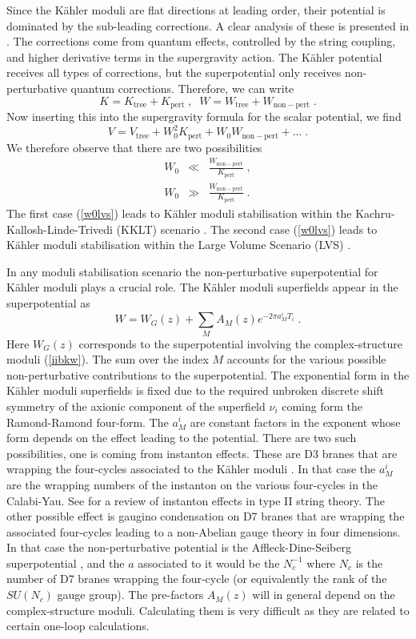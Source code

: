 \documentclass[11pt,a4paper]{article}
\numberwithin{equation}{section}
\numberwithin{table}{section}\setlength{\multlinegap}{25pt}
\newcommand{\bea}{\begin{eqnarray}}  \newcommand{\eea}{\end{eqnarray}}
\newcommand{\be}{\begin{equation}}
\newcommand{\ee}{\end{equation}}
\begin{document}
Since the K{\"a}hler moduli are flat directions at leading order, their potential is dominated by the sub-leading corrections. A clear analysis of these is presented in \cite{Conlon:2005ki}. The corrections come from quantum effects, controlled by the string coupling, and higher derivative terms in the supergravity action. The K{\"a}hler potential receives all types of corrections, but the superpotential only receives non-perturbative quantum corrections. Therefore, we can write 
\be
K = K_{\mathrm{tree}}  + K_{\mathrm{pert}} \;, \;\; W =  W_{\mathrm{tree}}  + W_{\mathrm{non-pert}} \;.
\ee
Now inserting this into the supergravity formula for the scalar potential, we find
\be
V = V_{\mathrm{tree}} + W_0^2 K_{\mathrm{pert}} + W_0 W_{\mathrm{non-pert}} + ... \;. 
\ee
We therefore observe that there are two possibilities 
\bea
\label{w0kklt}
W_0 &\ll& \frac{W_{\mathrm{non-pert}}}{K_{\mathrm{pert}}} \;, \\
W_0 &\gg& \frac{W_{\mathrm{non-pert}}}{K_{\mathrm{pert}}} \;.
\label{w0lvs}
\eea
The first case (\ref{w0lvs}) leads to K{\"a}hler moduli stabilisation within the Kachru-Kallosh-Linde-Trivedi (KKLT) scenario \cite{Kachru:2003aw}. The second case (\ref{w0lvs}) leads to K{\"a}hler moduli stabilisation within the Large Volume Scenario (LVS) \cite{Balasubramanian:2005zx}. 

In any moduli stabilisation scenario the non-perturbative superpotential for K{\"a}hler moduli plays a crucial role. The K{\"a}hler moduli superfields appear in the superpotential as
\be
W = W_G\left(z\right) + \sum_M A_M\left(z\right) e^{-2 \pi a^i_M T_i} \;.
\ee
Here $W_G\left(z\right)$ corresponds to the superpotential involving the complex-structure moduli (\ref{iibkw}). The sum over the index $M$ accounts for the various possible non-perturbative contributions to the superpotential. The exponential form in the K{\"a}hler moduli superfields is fixed due to the required unbroken discrete shift symmetry of the axionic component of the superfield $\nu_i$ coming form the Ramond-Ramond four-form. The $a^i_M$ are constant factors in the exponent whose form depends on the effect leading to the potential. There are two such possibilities, one is coming from instanton effects. These are D3 branes that are wrapping the four-cycles associated to the K{\"a}hler moduli \cite{Witten:1996bn}. In that case the $a^i_M$ are the wrapping numbers of the instanton on the various four-cycles in the Calabi-Yau. See \cite{Blumenhagen:2009qh} for a review of instanton effects in type II string theory. The other possible effect is gaugino condensation on D7 branes that are wrapping the associated four-cycles leading to a non-Abelian gauge theory in four dimensions. In that case the non-perturbative potential is the Affleck-Dine-Seiberg superpotential \cite{Affleck:1983mk}, and the $a$ associated to it would be the $N_c^{-1}$ where $N_c$ is the number of D7 branes wrapping the four-cycle (or equivalently the rank of the $SU(N_c)$ gauge group). The pre-factors $A_M\left(z\right)$ will in general depend on the complex-structure moduli. Calculating them is very difficult as they are related to certain one-loop calculations. 
\end{document}
